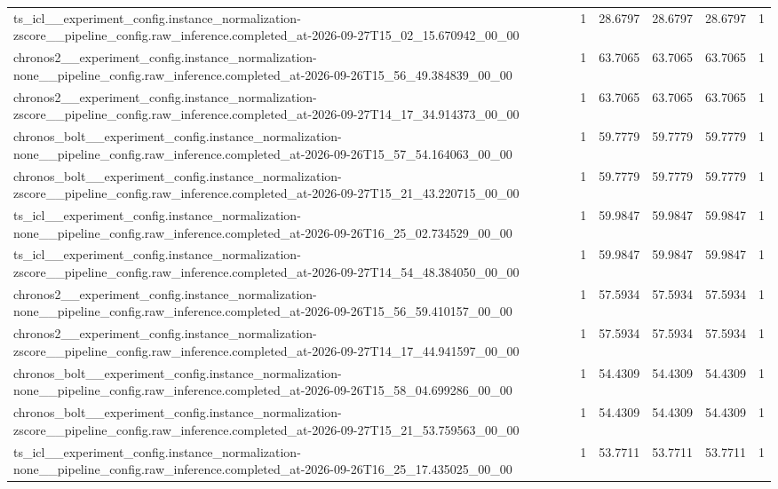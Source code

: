 \begin{tabular}{llllll}
ts\_icl\_\_experiment\_config.instance\_normalization-zscore\_\_pipeline\_config.raw\_inference.completed\_at-2026-09-27T15\_02\_15.670942\_00\_00 & 1 & 28.6797 & 28.6797 & 28.6797 & 1 \\
chronos2\_\_experiment\_config.instance\_normalization-none\_\_pipeline\_config.raw\_inference.completed\_at-2026-09-26T15\_56\_49.384839\_00\_00 & 1 & 63.7065 & 63.7065 & 63.7065 & 1 \\
chronos2\_\_experiment\_config.instance\_normalization-zscore\_\_pipeline\_config.raw\_inference.completed\_at-2026-09-27T14\_17\_34.914373\_00\_00 & 1 & 63.7065 & 63.7065 & 63.7065 & 1 \\
chronos\_bolt\_\_experiment\_config.instance\_normalization-none\_\_pipeline\_config.raw\_inference.completed\_at-2026-09-26T15\_57\_54.164063\_00\_00 & 1 & 59.7779 & 59.7779 & 59.7779 & 1 \\
chronos\_bolt\_\_experiment\_config.instance\_normalization-zscore\_\_pipeline\_config.raw\_inference.completed\_at-2026-09-27T15\_21\_43.220715\_00\_00 & 1 & 59.7779 & 59.7779 & 59.7779 & 1 \\
ts\_icl\_\_experiment\_config.instance\_normalization-none\_\_pipeline\_config.raw\_inference.completed\_at-2026-09-26T16\_25\_02.734529\_00\_00 & 1 & 59.9847 & 59.9847 & 59.9847 & 1 \\
ts\_icl\_\_experiment\_config.instance\_normalization-zscore\_\_pipeline\_config.raw\_inference.completed\_at-2026-09-27T14\_54\_48.384050\_00\_00 & 1 & 59.9847 & 59.9847 & 59.9847 & 1 \\
chronos2\_\_experiment\_config.instance\_normalization-none\_\_pipeline\_config.raw\_inference.completed\_at-2026-09-26T15\_56\_59.410157\_00\_00 & 1 & 57.5934 & 57.5934 & 57.5934 & 1 \\
chronos2\_\_experiment\_config.instance\_normalization-zscore\_\_pipeline\_config.raw\_inference.completed\_at-2026-09-27T14\_17\_44.941597\_00\_00 & 1 & 57.5934 & 57.5934 & 57.5934 & 1 \\
chronos\_bolt\_\_experiment\_config.instance\_normalization-none\_\_pipeline\_config.raw\_inference.completed\_at-2026-09-26T15\_58\_04.699286\_00\_00 & 1 & 54.4309 & 54.4309 & 54.4309 & 1 \\
chronos\_bolt\_\_experiment\_config.instance\_normalization-zscore\_\_pipeline\_config.raw\_inference.completed\_at-2026-09-27T15\_21\_53.759563\_00\_00 & 1 & 54.4309 & 54.4309 & 54.4309 & 1 \\
ts\_icl\_\_experiment\_config.instance\_normalization-none\_\_pipeline\_config.raw\_inference.completed\_at-2026-09-26T16\_25\_17.435025\_00\_00 & 1 & 53.7711 & 53.7711 & 53.7711 & 1 \\

\end{tabular}
